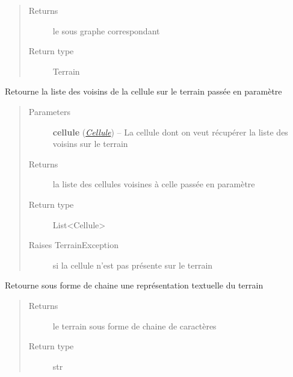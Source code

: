 \documentclass[letterpaper,10pt,english]{sphinxmanual}
\begin{document}
\begin{fulllineitems}
\begin{fulllineitems}
\begin{quote}
\begin{description}
\item[{Returns}] \leavevmode
le sous graphe correspondant

\item[{Return type}] \leavevmode
Terrain

\end{description}\end{quote}

\end{fulllineitems}


\begin{fulllineitems}
\label{index:Terrain.Terrain.getVoisinsCellule}
Retourne la liste des voisins de la cellule sur le terrain passée en paramètre
\begin{quote}\begin{description}
\item[{Parameters}] \leavevmode
\textbf{cellule} ({\hyperref[index:module-Cellule]{\emph{Cellule}}}) -- La cellule dont on veut récupérer la liste des voisins sur le terrain

\item[{Returns}] \leavevmode
la liste des cellules voisines à celle passée en paramètre

\item[{Return type}] \leavevmode
List\textless{}Cellule\textgreater{}

\item[{Raises TerrainException}] \leavevmode
si la cellule n'est pas présente sur le terrain

\end{description}\end{quote}

\end{fulllineitems}


\begin{fulllineitems}
\label{index:Terrain.Terrain.toString}
Retourne sous forme de chaine une représentation textuelle du terrain
\begin{quote}\begin{description}
\item[{Returns}] \leavevmode
le terrain sous forme de chaine de caractères

\item[{Return type}] \leavevmode
str

\end{description}\end{quote}

\end{fulllineitems}


\end{fulllineitems}
\end{document}
